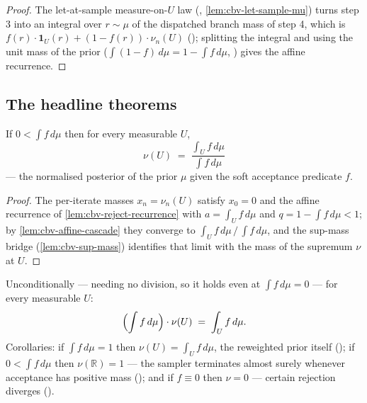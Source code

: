 \begin{proof}
The let-at-sample measure-on-$U$ law
(,
\autoref{lem:cbv-let-sample-mu}) turns step 3 into an integral over
$r \sim \mu$ of the dispatched branch mass of step 4, which is
$f(r)\cdot\mathbf{1}_U(r) + (1 - f(r))\cdot\nu_n(U)$
();
splitting the integral and using the unit mass of the prior
($\int (1 - f)\,d\mu = 1 - \int f\,d\mu$,
) gives the
affine recurrence.
\end{proof}

\subsection{The headline theorems}\label{ssec:cbv-reject-thms}

\begin{theorem}\label{thm:cbv-reject-posterior}
\rocqok
{}
If $0 < \int f\,d\mu$ then for every measurable $U$,
\[
  \nu(U) \;=\; \frac{\int_U f\,d\mu}{\int f\,d\mu}
\]
--- the normalised posterior of the prior $\mu$ given the soft
acceptance predicate $f$.
\end{theorem}

\begin{proof}
The per-iterate masses $x_n = \nu_n(U)$ satisfy $x_0 = 0$ and the
affine recurrence of \autoref{lem:cbv-reject-recurrence} with
$a = \int_U f\,d\mu$ and $q = 1 - \int f\,d\mu < 1$; by
\autoref{lem:cbv-affine-cascade} they converge to
$\int_U f\,d\mu \,/\, \int f\,d\mu$, and the sup-mass bridge
(\autoref{lem:cbv-sup-mass}) identifies that limit with the mass of
the supremum $\nu$ at $U$.
\end{proof}

\begin{theorem}\label{thm:cbv-reject-master}
\rocqok
{}\rocqok
{}\rocqok
{}\rocqok
{}
Unconditionally --- needing no division, so it holds even at
$\int f\,d\mu = 0$ --- for every measurable $U$:
\[
  \Bigl(\int f\,d\mu\Bigr) \cdot \nu(U) \;=\; \int_U f\,d\mu.
\]
Corollaries: if $\int f\,d\mu = 1$ then $\nu(U) = \int_U f\,d\mu$, the reweighted prior
itself
();
if $0 < \int f\,d\mu$ then $\nu(\mathbb{R}) = 1$ --- the sampler terminates
almost surely whenever acceptance has positive mass
(); and if
$f \equiv 0$ then $\nu = 0$ --- certain rejection diverges
().
\end{theorem}

